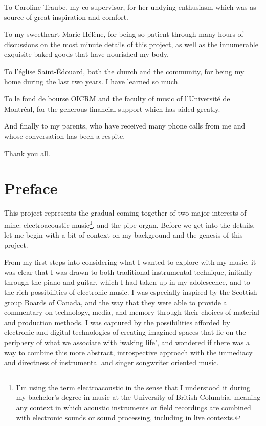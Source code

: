 \documentclass[12pt,twoside,maitrise]{dms_ks}
\theoremstyle{definition}
\begin{document}
To Caroline Traube, my co-supervisor, for her undying enthusiasm which was as source of great inspiration and comfort.

To my sweetheart Marie-Hélène, for being so patient through many hours of discussions on the most minute details of this project, as well as the innumerable exquisite baked goods that have nourished my body.

To l'église Saint-Édouard, both the church and the community, for being my home during the last two years. I have learned so much.

To le fond de bourse OICRM and the faculty of music of l'Université de Montréal, for the generous financial support which has aided greatly.

And finally to my parents, who have received many phone calls from me and whose conversation has been a respite.

Thank you all.


\NoChapterPageNumber
\cleardoublepage
{}


\chapter*{Preface}


This project represents the gradual coming together of two major interests of mine: electroacoustic music\footnote{I'm using the term electroacoustic in the sense that I understood it during my bachelor's degree in music at the University of British Columbia, meaning any context in which acoustic instruments or field recordings are combined with electronic sounds or sound processing, including in live contexts.}, and the pipe organ. 
Before we get into the details, let me begin with a bit of context on my background and the genesis of this project.

From my first steps into considering what I wanted to explore with my music, it was clear that I was drawn to both traditional instrumental technique, initially through the piano and guitar, which I had taken up in my adolescence, and to the rich possibilities of electronic music. 
I was especially inspired by the Scottish group Boards of Canada, and the way that they were able to provide a commentary on technology, media, and memory through their choices of material and production methods. 
I was captured by the possibilities afforded by electronic and digital technologies of creating imagined spaces that lie on the periphery of what we associate with `waking life', and wondered if there was a way to combine this more abstract, introspective approach with the immediacy and directness of instrumental and singer songwriter oriented music.
\end{document}
